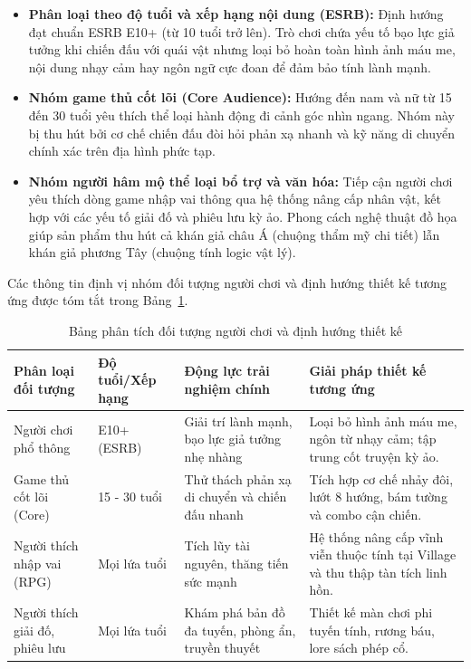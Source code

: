 \documentclass[../DoAn.tex]{subfiles}
\begin{document}
\begin{itemize}
    \item \textbf{Phân loại theo độ tuổi và xếp hạng nội dung (ESRB):} Định hướng đạt chuẩn ESRB E10+ (từ 10 tuổi trở lên). Trò chơi chứa yếu tố bạo lực giả tưởng khi chiến đấu với quái vật nhưng loại bỏ hoàn toàn hình ảnh máu me, nội dung nhạy cảm hay ngôn ngữ cực đoan để đảm bảo tính lành mạnh.
    \item \textbf{Nhóm game thủ cốt lõi (Core Audience):} Hướng đến nam và nữ từ 15 đến 30 tuổi yêu thích thể loại hành động đi cảnh góc nhìn ngang. Nhóm này bị thu hút bởi cơ chế chiến đấu đòi hỏi phản xạ nhanh và kỹ năng di chuyển chính xác trên địa hình phức tạp.
    \item \textbf{Nhóm người hâm mộ thể loại bổ trợ và văn hóa:} Tiếp cận người chơi yêu thích dòng game nhập vai thông qua hệ thống nâng cấp nhân vật, kết hợp với các yếu tố giải đố và phiêu lưu kỳ ảo. Phong cách nghệ thuật đồ họa giúp sản phẩm thu hút cả khán giả châu Á (chuộng thẩm mỹ chi tiết) lẫn khán giả phương Tây (chuộng tính logic vật lý).
\end{itemize}
Các thông tin định vị nhóm đối tượng người chơi và định hướng thiết kế tương ứng được tóm tắt trong Bảng~\ref{table:target_audience}.

\begin{table}[H]
\centering
\begin{tabular}{|p{3cm}|p{2.5cm}|p{4cm}|p{4.5cm}|}
\hline
\textbf{Phân loại đối tượng} & \textbf{Độ tuổi/Xếp hạng} & \textbf{Động lực trải nghiệm chính} & \textbf{Giải pháp thiết kế tương ứng} \\ \hline
Người chơi phổ thông & E10+ (ESRB) & Giải trí lành mạnh, bạo lực giả tưởng nhẹ nhàng & Loại bỏ hình ảnh máu me, ngôn từ nhạy cảm; tập trung cốt truyện kỳ ảo. \\ \hline
Game thủ cốt lõi (Core) & 15 - 30 tuổi & Thử thách phản xạ di chuyển và chiến đấu nhanh & Tích hợp cơ chế nhảy đôi, lướt 8 hướng, bám tường và combo cận chiến. \\ \hline
Người thích nhập vai (RPG) & Mọi lứa tuổi & Tích lũy tài nguyên, thăng tiến sức mạnh & Hệ thống nâng cấp vĩnh viễn thuộc tính tại Village và thu thập tàn tích linh hồn. \\ \hline
Người thích giải đố, phiêu lưu & Mọi lứa tuổi & Khám phá bản đồ đa tuyến, phòng ẩn, truyền thuyết & Thiết kế màn chơi phi tuyến tính, rương báu, lore sách phép cổ. \\ \hline
\end{tabular}
\caption{Bảng phân tích đối tượng người chơi và định hướng thiết kế}
\label{table:target_audience}
\end{table}
\end{document}

